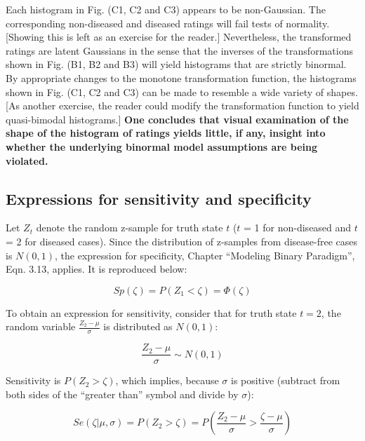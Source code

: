 \documentclass[
]{book}
\begin{document}
Each histogram in Fig. (C1, C2 and C3) appears to be non-Gaussian. The corresponding non-diseased and diseased ratings will fail tests of normality. {[}Showing this is left as an exercise for the reader.{]} Nevertheless, the transformed ratings are latent Gaussians in the sense that the inverses of the transformations shown in Fig. (B1, B2 and B3) will yield histograms that are strictly binormal. By appropriate changes to the monotone transformation function, the histograms shown in Fig. (C1, C2 and C3) can be made to resemble a wide variety of shapes. {[}As another exercise, the reader could modify the transformation function to yield quasi-bimodal histograms.{]} \textbf{One concludes that visual examination of the shape of the histogram of ratings yields little, if any, insight into whether the underlying binormal model assumptions are being violated.}

\hypertarget{expressions-for-sensitivity-and-specificity}{%
\subsection{Expressions for sensitivity and specificity}\label{expressions-for-sensitivity-and-specificity}}

Let \(Z_t\) denote the random z-sample for truth state \(t\) (\(t\) = 1 for non-diseased and \(t\) = 2 for diseased cases). Since the distribution of z-samples from disease-free cases is \(N(0,1)\), the expression for specificity, Chapter ``Modeling Binary Paradigm'', Eqn. 3.13, applies. It is reproduced below:

\begin{equation} 
Sp\left ( \zeta \right )=P\left ( Z_1 < \zeta \right )=\Phi\left ( \zeta \right )
\label{eq:BinModSp}
\end{equation}

To obtain an expression for sensitivity, consider that for truth state \(t = 2\), the random variable \(\frac{Z_2-\mu}{\sigma}\) is distributed as \(N(0,1)\):

\begin{equation*} 
\frac{Z_2-\mu}{\sigma}\sim N\left ( 0,1 \right )
\end{equation*}

Sensitivity is \(P\left ( Z_2 > \zeta \right )\), which implies, because \(\sigma\) is positive (subtract from both sides of the ``greater than'' symbol and divide by \(\sigma\)):

\begin{equation} 
Se\left ( \zeta | \mu, \sigma \right )= P\left ( Z_2 > \zeta \right )=P\left ( \frac{Z_2-\mu}{\sigma} > \frac{\zeta-\mu}{\sigma} \right )
\label{eq:BinModSe}
\end{equation}
\end{document}
